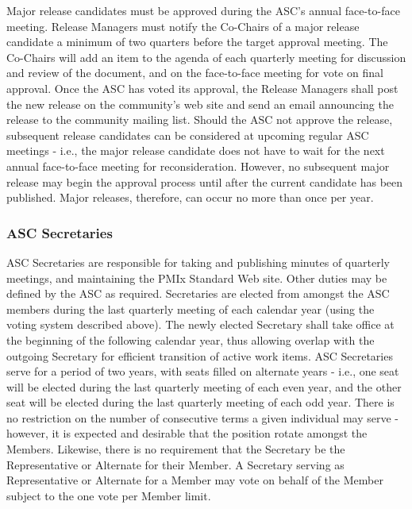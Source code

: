 \documentclass{article}
\begin{document}
Major release candidates must be approved during the ASC's annual
face-to-face meeting. Release Managers must notify the Co-Chairs of a
major release candidate a minimum of two quarters before the target
approval meeting. The Co-Chairs will add an item to the agenda of each
quarterly meeting for discussion and review of the document, and on the
face-to-face meeting for vote on final approval. Once the ASC has voted
its approval, the Release Managers shall post the new release on the
community's web site and send an email announcing the release to the
community mailing list. Should the ASC not approve the release,
subsequent release candidates can be considered at upcoming regular ASC
meetings - i.e., the major release candidate does not have to wait for
the next annual face-to-face meeting for reconsideration. However, no
subsequent major release may begin the approval process until after the
current candidate has been published. Major releases, therefore, can
occur no more than once per year.

\hypertarget{asc-secretaries}{%
\subsubsection{ASC Secretaries}%
\label{asc-secretaries}}

ASC Secretaries are responsible for taking and publishing minutes of
quarterly meetings, and maintaining the PMIx Standard Web site. Other
duties may be defined by the ASC as required. Secretaries are elected
from amongst the ASC members during the last quarterly meeting of each
calendar year (using the voting system described above). The newly
elected Secretary shall take office at the beginning of the following
calendar year, thus allowing overlap with the outgoing Secretary for
efficient transition of active work items. ASC Secretaries serve for a
period of two years, with seats filled on alternate years - i.e., one
seat will be elected during the last quarterly meeting of each even
year, and the other seat will be elected during the last quarterly
meeting of each odd year. There is no restriction on the number of
consecutive terms a given individual may serve - however, it is expected
and desirable that the position rotate amongst the Members. Likewise,
there is no requirement that the Secretary be the Representative or
Alternate for their Member. A Secretary serving as Representative or
Alternate for a Member may vote on behalf of the Member subject to the
one vote per Member limit.
\end{document}
